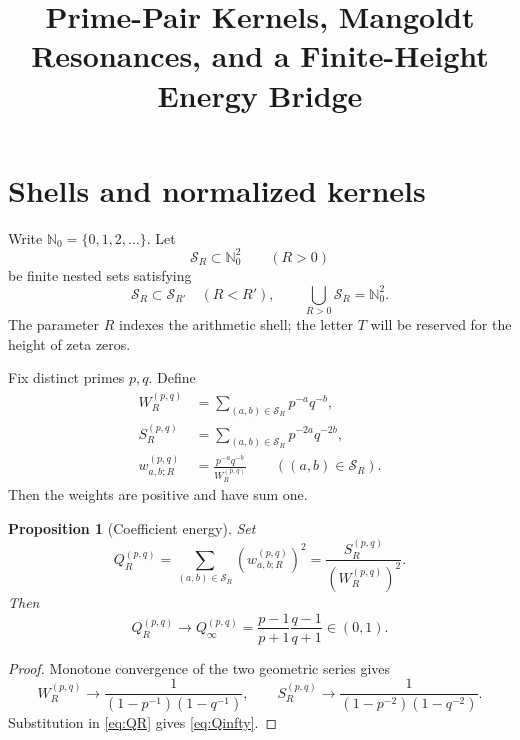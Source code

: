 \documentclass[11pt]{amsart}
\title[Prime-Pair Kernels]{Prime-Pair Kernels, Mangoldt Resonances, and a Finite-Height Energy Bridge}
\author{}
\date{}
\numberwithin{equation}{section}
\theoremstyle{plain}
\newtheorem{proposition}[theorem]{Proposition}
\theoremstyle{definition}
\theoremstyle{remark}
\begin{document}
\maketitle
\tableofcontents

\section{Shells and normalized kernels}
\label{sec:shells}

Write $\mathbb N_0=\{0,1,2,\ldots\}$.  Let
\begin{equation}
\mathcal S_R\subset\mathbb N_0^2
\qquad(R>0)
\label{eq:shells}
\end{equation}
be finite nested sets satisfying
\begin{equation}
\mathcal S_R\subset\mathcal S_{R'}\quad(R<R'),
\qquad
\bigcup_{R>0}\mathcal S_R=\mathbb N_0^2.
\label{eq:shell_exhaustion}
\end{equation}
The parameter $R$ indexes the arithmetic shell; the letter $T$ will be reserved for the height of zeta zeros.

Fix distinct primes $p,q$.  Define
\begin{align}
W_R^{(p,q)}
&=
\sum_{(a,b)\in\mathcal S_R}p^{-a}q^{-b},
\label{eq:WR}
\\
S_R^{(p,q)}
&=
\sum_{(a,b)\in\mathcal S_R}p^{-2a}q^{-2b},
\label{eq:SR}
\\
w_{a,b;R}^{(p,q)}
&=
\frac{p^{-a}q^{-b}}{W_R^{(p,q)}}
\qquad((a,b)\in\mathcal S_R).
\label{eq:weights}
\end{align}
Then the weights are positive and have sum one.

\begin{proposition}[Coefficient energy]
\label{prop:coefficient_energy}
Set
\begin{equation}
Q_R^{(p,q)}
=
\sum_{(a,b)\in\mathcal S_R}
\left(w_{a,b;R}^{(p,q)}\right)^2
=
\frac{S_R^{(p,q)}}{\left(W_R^{(p,q)}\right)^2}.
\label{eq:QR}
\end{equation}
Then
\begin{equation}
Q_R^{(p,q)}\longrightarrow
Q_\infty^{(p,q)}
=
\frac{p-1}{p+1}\frac{q-1}{q+1}
\in(0,1).
\label{eq:Qinfty}
\end{equation}
\end{proposition}

\begin{proof}
Monotone convergence of the two geometric series gives
\begin{equation}
W_R^{(p,q)}\longrightarrow
\frac{1}{(1-p^{-1})(1-q^{-1})},
\qquad
S_R^{(p,q)}\longrightarrow
\frac{1}{(1-p^{-2})(1-q^{-2})}.
\label{eq:geometric_limits}
\end{equation}
Substitution in \eqref{eq:QR} gives \eqref{eq:Qinfty}.
\end{proof}
\end{document}
